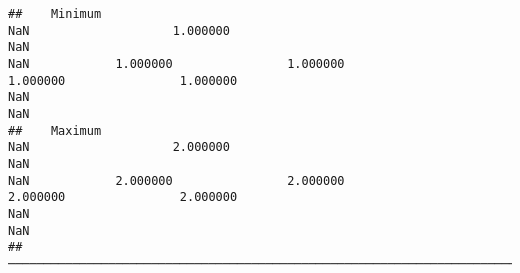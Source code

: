 \documentclass[
]{article}
\begin{document}
\begin{verbatim}
##    Minimum                                                                  NaN                    1.000000                                                                  NaN                                                                  NaN            1.000000                1.000000                1.000000                1.000000                                                                  NaN                                                                  NaN   
##    Maximum                                                                  NaN                    2.000000                                                                  NaN                                                                  NaN            2.000000                2.000000                2.000000                2.000000                                                                  NaN                                                                  NaN   
##  ────────────────────────────────────────────────────────────────────────────────────────────────────────────────────────────────────────────────────────────────────────────────────────────────────────────────────────────────────────────────────────────────────────────────────────────────────────────────────────────────────────────────────────────────────────────────────────────────────────────────────────────────────────────────────────────────────────────────────────────
\end{verbatim}
\end{document}
